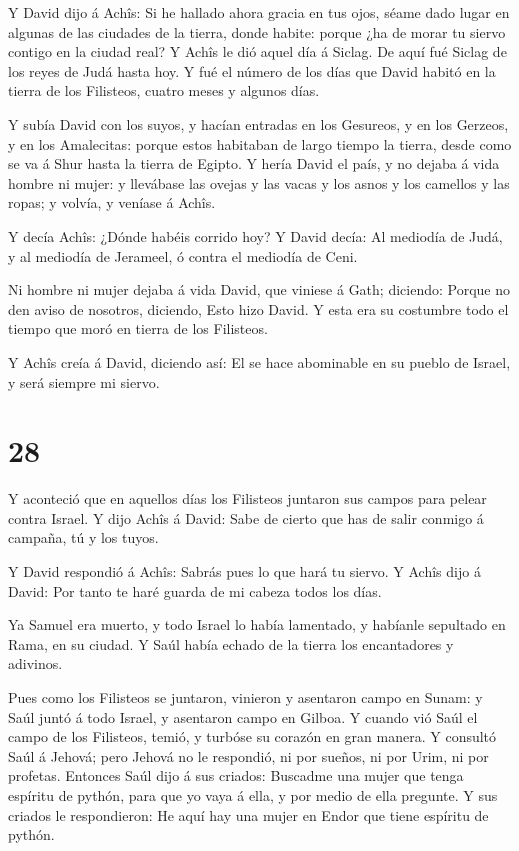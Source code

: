  Y David dijo á Achîs: Si he hallado ahora gracia en tus
ojos, séame dado lugar en algunas de las ciudades de la tierra, donde
habite: porque ¿ha de morar tu siervo contigo en la ciudad real?
 Y Achîs le dió aquel día á Siclag. De aquí fué Siclag de
los reyes de Judá hasta hoy.  Y fué el número de los días
que David habitó en la tierra de los Filisteos, cuatro meses y algunos
días.

 Y subía David con los suyos, y hacían entradas en los
Gesureos, y en los Gerzeos, y en los Amalecitas: porque estos habitaban
de largo tiempo la tierra, desde como se va á Shur hasta la tierra de
Egipto.  Y hería David el país, y no dejaba á vida hombre ni
mujer: y llevábase las ovejas y las vacas y los asnos y los camellos y
las ropas; y volvía, y veníase á Achîs.

 Y decía Achîs: ¿Dónde habéis corrido hoy? Y David decía:
Al mediodía de Judá, y al mediodía de Jerameel, ó contra el mediodía de
Ceni.

 Ni hombre ni mujer dejaba á vida David, que viniese á
Gath; diciendo: Porque no den aviso de nosotros, diciendo, Esto hizo
David. Y esta era su costumbre todo el tiempo que moró en tierra de los
Filisteos.

 Y Achîs creía á David, diciendo así: El se hace abominable
en su pueblo de Israel, y será siempre mi siervo.

\hypertarget{section-27}{%
\section{28}\label{section-27}}

 Y aconteció que en aquellos días los Filisteos juntaron sus
campos para pelear contra Israel. Y dijo Achîs á David: Sabe de cierto
que has de salir conmigo á campaña, tú y los tuyos.

 Y David respondió á Achîs: Sabrás pues lo que hará tu
siervo. Y Achîs dijo á David: Por tanto te haré guarda de mi cabeza
todos los días.

 Ya Samuel era muerto, y todo Israel lo había lamentado, y
habíanle sepultado en Rama, en su ciudad. Y Saúl había echado de la
tierra los encantadores y adivinos.

 Pues como los Filisteos se juntaron, vinieron y asentaron
campo en Sunam: y Saúl juntó á todo Israel, y asentaron campo en Gilboa.
 Y cuando vió Saúl el campo de los Filisteos, temió, y
turbóse su corazón en gran manera.  Y consultó Saúl á
Jehová; pero Jehová no le respondió, ni por sueños, ni por Urim, ni por
profetas.  Entonces Saúl dijo á sus criados: Buscadme una
mujer que tenga espíritu de pythón, para que yo vaya á ella, y por medio
de ella pregunte. Y sus criados le respondieron: He aquí hay una mujer
en Endor que tiene espíritu de pythón.

